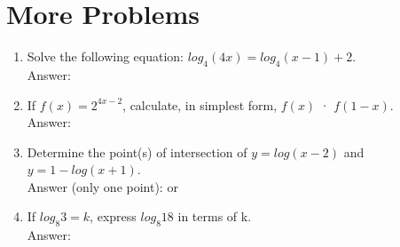 \documentclass[12pt]{extarticle}
\begin{document}
\section{More Problems}
\begin{enumerate}
    \itemsep 2.5em
    \item {Solve the following equation: $log_4 (4x) = log_4 (x - 1) + 2.$ \\Answer: }
    \item {If $f(x) = 2^{4x-2}$, calculate, in simplest form, $f(x)$ · $f(1 - x)$. \\Answer: }
    \item {Determine the point(s) of intersection of $y = log(x - 2)$ and $y = 1 - log(x + 1)$. \\Answer (only one point):  or }
    \item {If $log_8 3 = k$, express $log_8 18$ in terms of k. \\Answer: }
\end{enumerate}
\end{document}
